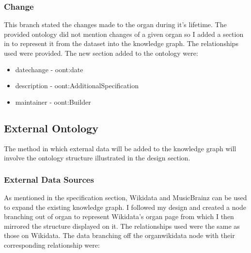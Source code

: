 \subsubsection{Change}
\hspace*{0.5cm} This branch stated the changes made to the organ during it's lifetime. The provided ontology did not mention changes of a given organ so I added a section in to represent it from the dataset into the knowledge graph. The relationships used were provided. The new section added to the ontology were:

\begin{itemize}
    \itemsep0em 
    \item datechange - oont:date 
    \item description - oont:AdditionalSpecification
    \item maintainer - oont:Builder
\end{itemize}

\subsection{External Ontology}
\hspace*{0.5cm} The method in which external data will be added to the knowledge graph will involve the ontology structure illustrated in the design section.

\subsubsection{External Data Sources}
\hspace*{0.5cm} As mentioned in the specification section, Wikidata and MusicBrainz can be used to expand the existing knowledge graph. I followed my design and created a node branching out of organ to represent Wikidata's organ page \cite{organwikidata} from which I then mirrored the structure displayed on it. The relationships used were the same as those on Wikidata. The data branching off the organwikidata node with their corresponding relationship were:

